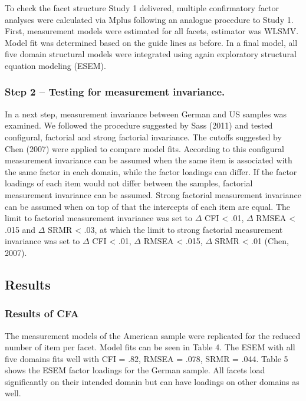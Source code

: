 \documentclass[man]{apa6}
\theoremstyle{definition}
\theoremstyle{definition}
\theoremstyle{definition}
\theoremstyle{remark}
\begin{document}
To check the facet structure Study 1 delivered, multiple confirmatory
factor analyses were calculated via Mplus following an analogue
procedure to Study 1. First, measurement models were estimated for all
facets, estimator was WLSMV. Model fit was determined based on the guide
lines as before. In a final model, all five domain structural models
were integrated using again exploratory structural equation modeling
(ESEM).

\hypertarget{step-2-testing-for-measurement-invariance.}{%
\subsubsection{Step 2 -- Testing for measurement
invariance.}\label{step-2-testing-for-measurement-invariance.}}

In a next step, measurement invariance between German and US samples was
examined. We followed the procedure suggested by Sass (2011) and tested
configural, factorial and strong factorial invariance. The cutoffs
suggested by Chen (2007) were applied to compare model fits. According
to this configural measurement invariance can be assumed when the same
item is associated with the same factor in each domain, while the factor
loadings can differ. If the factor loadings of each item would not
differ between the samples, factorial measurement invariance can be
assumed. Strong factorial measurement invariance can be assumed when on
top of that the intercepts of each item are equal. The limit to
factorial measurement invariance was set to \(\Delta\) CFI \textless{}
.01, \(\Delta\) RMSEA \textless{} .015 and \(\Delta\) SRMR \textless{}
.03, at which the limit to strong factorial measurement invariance was
set to \(\Delta\) CFI \textless{} .01, \(\Delta\) RMSEA \textless{}
.015, \(\Delta\) SRMR \textless{} .01 (Chen, 2007).

\hypertarget{results-1}{%
\subsection{Results}\label{results-1}}

\hypertarget{results-of-cfa}{%
\subsubsection{Results of CFA}\label{results-of-cfa}}

The measurement models of the American sample were replicated for the
reduced number of item per facet. Model fits can be seen in Table 4. The
ESEM with all five domains fits well with CFI = .82, RMSEA = .078, SRMR
= .044. Table 5 shows the ESEM factor loadings for the German sample.
All facets load significantly on their intended domain but can have
loadings on other domains as well.
\end{document}
